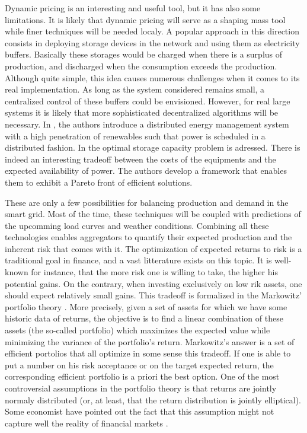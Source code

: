 \documentclass[conference]{IEEEtran}
\begin{document}
Dynamic pricing is an interesting and useful tool, but it has also some limitations. It is likely that dynamic pricing will serve as a shaping mass tool while finer techniques will be needed localy. A popular approach in this direction consists in deploying storage devices in the network and using them as electricity buffers. Basically these storages would be charged when there is a surplus of production, and discharged when the consumption exceeds the production. Although quite simple, this idea causes numerous challenges when it comes to its real implementation. As long as the system considered remains small, a centralized control of these buffers could be envisioned. However, for real large systems it is likely that more sophisticated decentralized algorithms will be necessary. In \cite{Zhang2013}, the authors introduce a distributed energy management system with a high penetration of renewables such that power is scheduled in a distributed fashion. In \cite{Shadmand2014} the optimal storage capacity problem is adressed. There is indeed an interesting tradeoff between the costs of the equipments and the expected availability of power. The authors develop a framework that enables them to exhibit a Pareto front of efficient solutions.

These are only a few possibilities for balancing production and demand in the smart grid. Most of the time, these techniques will be coupled with predictions of the upcomming load curves and weather conditions. Combining all these technologies enables aggregators to quantify their expected production and the inherent risk that comes with it. The optimization of expected returns to risk is a traditional goal in finance, and a vast litterature exists on this topic. It is well-known for instance, that the more risk one is willing to take, the higher his potential gains. On the contrary, when investing exclusively on low rik assets, one should expect relatively small gains. This tradeoff is formalized in the Markowitz' portfolio theory \cite{Markowitz1959}. More precisely, given a set of assets for which we have some historic data of returns, the objective is to find a linear combination of these assets (the so-called portfolio) which maximizes the expected value while minimizing the variance of the portfolio's return. Markowitz's answer is a set of efficient portolios that all optimize in some sense this tradeoff. If one is able to put a number on his risk acceptance or on the target expected return, the corresponding efficient portfolio is a priori the best option. One of the most controversial assumptions in the portfolio theory is that returns are jointly normaly distributed (or, at least, that the return distribution is jointly elliptical). Some economist have pointed out the fact that this assumption might not capture well the reality of financial markets \cite{Chicheportiche2010}.
\end{document}
